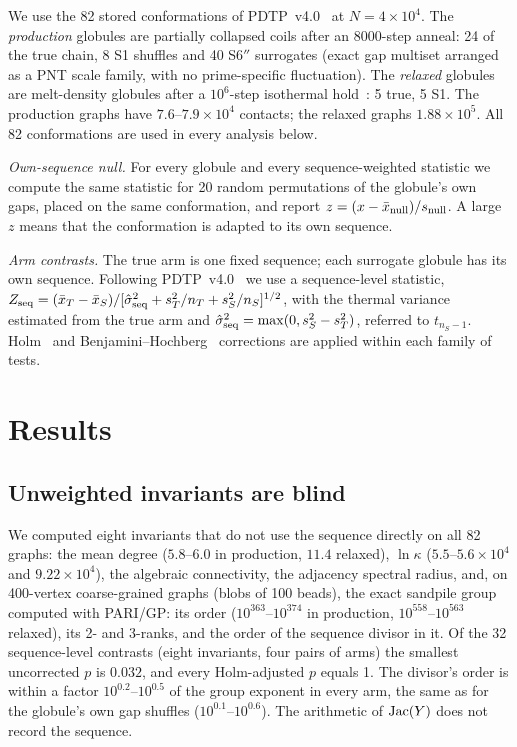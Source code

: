 \documentclass[reprint,amsmath,amssymb,aps,pre,longbibliography]{revtex4-2}
\begin{document}
We use the 82 stored conformations of PDTP~v4.0~\cite{PDTP4} at $N=4\times10^4$. The
\emph{production} globules are partially collapsed coils after an 8000-step anneal: 24 of the true
chain, 8 S1 shuffles and 40 S6$''$ surrogates (exact gap multiset arranged as a PNT scale family,
with no prime-specific fluctuation). The \emph{relaxed} globules are melt-density globules after a
$10^6$-step isothermal hold~\cite{Merged}: 5 true, 5 S1. The production graphs have
$7.6$--$7.9\times10^4$ contacts; the relaxed graphs $1.88\times10^5$. All 82 conformations are used in every analysis below.

\emph{Own-sequence null.} For every globule and every sequence-weighted statistic we compute the
same statistic for 20 random permutations of the globule's own gaps, placed on the same
conformation, and report $z=(x-\bar x_{\rm null})/s_{\rm null}$. A large $z$ means that the
conformation is adapted to its own sequence.

\emph{Arm contrasts.} The true arm is one fixed sequence; each surrogate globule has its own
sequence. Following PDTP~v4.0~\cite{PDTP4} we use a sequence-level statistic,
$Z_{\rm seq}=(\bar x_T-\bar x_S)/[\hat\sigma^2_{\rm seq}+s_T^2/n_T+s_S^2/n_S]^{1/2}$, with the
thermal variance estimated from the true arm and
$\hat\sigma^2_{\rm seq}=\max(0,s_S^2-s_T^2)$, referred to $t_{n_S-1}$. Holm~\cite{Holm} and
Benjamini--Hochberg~\cite{BH} corrections are applied within each family of tests.

\section{Results}\label{sec:results}

\subsection{Unweighted invariants are blind}
We computed eight invariants that do not use the sequence directly on all 82 graphs: the mean
degree ($5.8$--$6.0$ in production, $11.4$ relaxed), $\ln\kappa$ ($5.5$--$5.6\times10^4$ and
$9.22\times10^4$), the algebraic connectivity, the adjacency spectral radius, and, on 400-vertex
coarse-grained graphs (blobs of 100 beads), the exact sandpile group computed with PARI/GP: its
order ($10^{363}$--$10^{374}$ in production, $10^{558}$--$10^{563}$ relaxed), its 2- and 3-ranks,
and the order of the sequence divisor in it. Of the 32 sequence-level contrasts (eight invariants,
four pairs of arms) the smallest uncorrected $p$ is $0.032$, and every Holm-adjusted $p$ equals 1.
The divisor's order is within a factor $10^{0.2}$--$10^{0.5}$ of the group exponent in every arm,
the same as for the globule's own gap shuffles ($10^{0.1}$--$10^{0.6}$). The arithmetic of
${\rm Jac}(Y)$ does not record the sequence.
\end{document}
